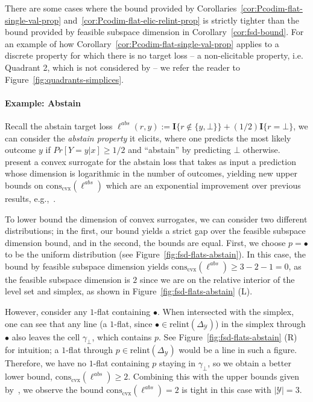 \documentclass[11pt]{article} %
\newcommand{\Comments}{1}
\newcommand{\mytodo}[2]{\ifnum\Comments=1%
	\todo[linecolor=#1!80!black,backgroundcolor=#1,bordercolor=#1!80!black]{#2}\fi}
\newcommand{\raft}[1]{\mytodo{green!20!white}{RF: #1}}
\newcommand{\jessiet}[1]{\mytodo{teal!20!white}{JF: #1}}
\newcommand{\simplex}{\Delta_\Y}
\newcommand{\relint}[1]{\mathrm{relint}(#1)}
\newcommand{\conscvx}{\mathrm{cons}_\mathrm{cvx}}
\newcommand{\Y}{\mathcal{Y}}
\newcommand{\Ind}[1]{\mathbf{I}\{{#1}\}}
\begin{document}
There are some cases where the bound provided by Corollaries~\ref{cor:Pcodim-flat-single-val-prop} and~\ref{cor:Pcodim-flat-elic-relint-prop} is strictly tighter than the bound provided by feasible subspace dimension in Corollary~\ref{cor:fsd-bound}.
For an example of how Corollary~\ref{cor:Pcodim-flat-single-val-prop} applies to a discrete property for which there is no target loss -- a non-elicitable property, i.e. Quadrant 2, which is not considered by \citet{ramaswamy2018consistent} -- we refer the reader to Figure~\ref{fig:quadrants-simplices}.

\paragraph{Example: Abstain}\label{subsec:examples-finite}
Recall the abstain target loss $\ell^{abs}(r,y) := \Ind{r \not \in \{y, \bot\}} + (1/2)\Ind{r = \bot}$,  we can consider the \emph{abstain property} it elicits, where one predicts the most likely outcome $y$ if $Pr[Y=y|x] \geq 1/2$ and ``abstain'' by predicting $\bot$ otherwise.
\citet{ramaswamy2016convex} present a convex surrogate for the abstain loss that takes as input a prediction whose dimension is logarithmic in the number of outcomes, yielding new upper bounds on $\conscvx(\ell^{abs})$ which are an exponential improvement over previous results, e.g.,~\cite{crammer2001algorithmic}.

To lower bound the dimension of convex surrogates, we can consider two different distributions; in the first, our bound yields a strict gap over the feasible subspace dimension bound, and in the second, the bounds are equal.
First, we choose $p = \bullet$ to be the uniform distribution (see Figure~\ref{fig:fsd-flats-abstain}).
In this case, the bound by feasible subspace dimension yields $\conscvx(\ell^{abs}) \geq 3 - 2 - 1 = 0$, as the feasible subspace dimension is $2$ since we are on the relative interior of the level set and simplex, as shown in Figure~\ref{fig:fsd-flats-abstain} (L).


However, consider any $1$-flat containing $\bullet$.
When intersected with the simplex, one can see that any line (a $1$-flat, since $\bullet \in \relint{\simplex}$) in the simplex through $\bullet$ also leaves the cell $\gamma_\bot$, which contains $p$.
See Figure~\ref{fig:fsd-flats-abstain} (R) for intuition; a $1$-flat through $p \in \relint{\simplex}$ would be a line in such a figure.
Therefore, we have no $1$-flat containing $p$ staying in $\gamma_\bot$, so we obtain a better lower bound, $\conscvx(\ell^{abs}) \geq 2$.
Combining this with the upper bounds given by~\cite{ramaswamy2018consistent}, we observe the bound $\conscvx(\ell^{abs}) = 2$ is tight in this case with $|\Y|=3$.
\end{document}
